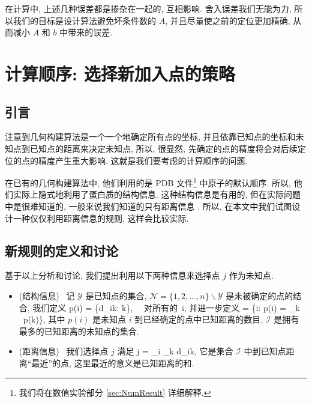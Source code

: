 在计算中, 上述几种误差都是掺杂在一起的, 互相影响.
舍入误差我们无能为力, 所以我们的目标是设计算法避免坏条件数的 $A$,
并且尽量使之前的定位更加精确, 从而减小 $A$ 和 $b$ 中带来的误差.


\section{计算顺序: 选择新加入点的策略}
\label{sec:CompOrder}

\subsection{引言}
注意到几何构建算法是一个一个地确定所有点的坐标, 
并且依靠已知点的坐标和未知点到已知点的距离来决定未知点,
所以, 很显然, 先确定的点的精度将会对后续定位的点的精度产生重大影响.
这就是我们要考虑的计算顺序的问题.

在已有的几何构建算法中, 他们利用的是 PDB 文件\footnote{我们将在数值实验部分 \ref{sec:NumResult} 详细解释.}
中原子的默认顺序.
所以, 他们实际上隐式地利用了蛋白质的结构信息.
这种结构信息是有用的, 但在实际问题中是很难知道的, 
一般来说我们知道的只有距离信息 \cite{Dong2002}.
所以, 在本文中我们试图设计一种仅仅利用距离信息的规则,
这样会比较实际.

\subsection{新规则的定义和讨论}
基于以上分析和讨论, 我们提出利用以下两种信息来选择点 $j$ 作为未知点.
\begin{itemize}
  \item (结构信息)%
  ~记 $\mathcal{Y}$ 是已知点的集合, $\mathcal{N} = \{1,2,\ldots,n\}\backslash \mathcal{Y}$ 是未被确定的点的结合, 我们定义
  \be p(i) = \sharp \{d_{ik}: k\in {}\}, ~~对所有的~i\in {}, \label{rule1} \ee
  并进一步定义
  \be {} = \{i: p(i) = \max_{k\in {}} ~p(k)\}, \label{rule2}\ee
  其中 $p(i)$ 是未知点 $i$ 到已经确定的点中已知距离的数目, $\mathcal{I}$ 是拥有最多的已知距离的未知点的集合.
  \item (距离信息)%
  ~我们选择点 $j$ 满足
  \be j = \arg\min_{i\in {}} \sum_{k\in {}} d_{ik}, \label{rule3}\ee
  它是集合 $\mathcal{I}$ 中到已知点距离``最近''的点, 这里最近的意义是已知距离的和.
\end{itemize}

